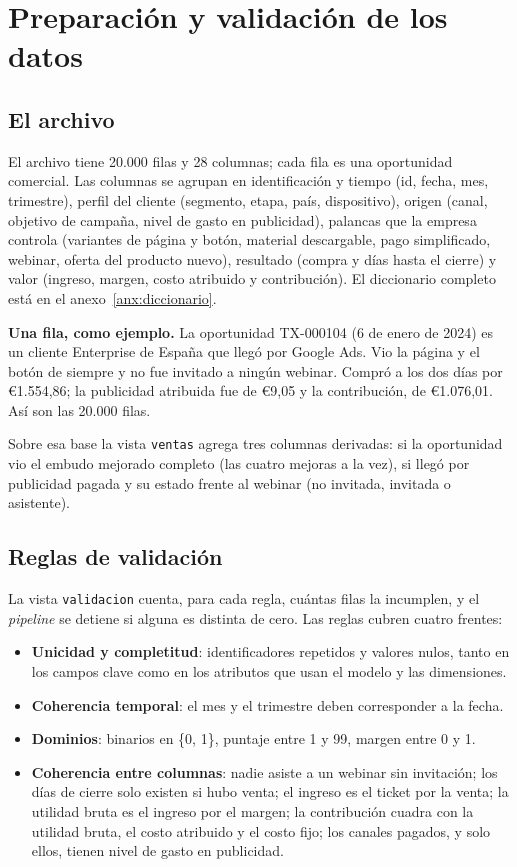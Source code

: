 \documentclass[11pt,letterpaper]{article}
\begin{document}
\section{Preparación y validación de los datos}

\subsection{El archivo}

El archivo tiene 20.000 filas y 28 columnas; cada fila es una oportunidad comercial. Las columnas se agrupan
en identificación y tiempo (id, fecha, mes, trimestre), perfil del cliente (segmento, etapa, país,
dispositivo), origen (canal, objetivo de campaña, nivel de gasto en publicidad), palancas que la empresa
controla (variantes de página y botón, material descargable, pago simplificado, webinar, oferta del producto
nuevo), resultado (compra y días hasta el cierre) y valor (ingreso, margen, costo atribuido y contribución). El
diccionario completo está en el anexo~\ref{anx:diccionario}.

\textbf{Una fila, como ejemplo.} La oportunidad TX-000104 (6 de enero de 2024) es un cliente Enterprise de
España que llegó por Google Ads. Vio la página y el botón de siempre y no fue invitado a ningún webinar. Compró a
los dos días por €1.554,86; la publicidad atribuida fue de €9,05 y la contribución, de €1.076,01. Así son las
20.000 filas.

Sobre esa base la vista \texttt{ventas} agrega tres columnas derivadas: si la oportunidad vio el embudo
mejorado completo (las cuatro mejoras a la vez), si llegó por publicidad pagada y su estado frente al webinar
(no invitada, invitada o asistente).

\subsection{Reglas de validación}

La vista \texttt{validacion} cuenta, para cada regla, cuántas filas la incumplen, y el \textit{pipeline} se
detiene si alguna es distinta de cero. Las reglas cubren cuatro frentes:

\begin{itemize}
  \item \textbf{Unicidad y completitud}: identificadores repetidos y valores nulos, tanto en los campos clave
        como en los atributos que usan el modelo y las dimensiones.
  \item \textbf{Coherencia temporal}: el mes y el trimestre deben corresponder a la fecha.
  \item \textbf{Dominios}: binarios en \{0, 1\}, puntaje entre 1 y 99, margen entre 0 y 1.
  \item \textbf{Coherencia entre columnas}: nadie asiste a un webinar sin invitación; los días de cierre solo
        existen si hubo venta; el ingreso es el ticket por la venta; la utilidad bruta es el ingreso por el
        margen; la contribución cuadra con la utilidad bruta, el costo atribuido y el costo fijo; los canales
        pagados, y solo ellos, tienen nivel de gasto en publicidad.
\end{itemize}
\end{document}
